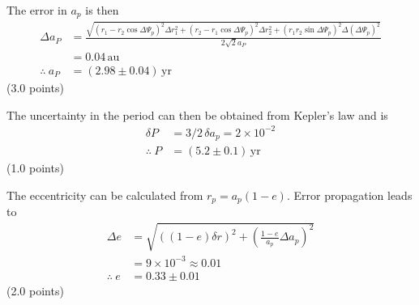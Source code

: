 \begin{description}
  The error in $a_p$ is then
  \begin{align*}
    \Delta a_P &= \frac{\sqrt{(r_1 - r_2\cos\Delta\Psi_p)^2\Delta r_1^2
      + (r_2 - r_1\cos\Delta\Psi_p)^2\Delta r_2^2
      + (r_1 r_2\sin\Delta\Psi_p)^2\Delta(\Delta\Psi_p)^2}}{2\sqrt{2}a_P} \\
      &= 0.04\,\mathrm{au} \\
    \therefore\ a_P &= (2.98\pm0.04)\,\mathrm{yr} %
  \end{align*}
  \hfill(3.0 points)

  The uncertainty in the period can then be obtained from Kepler's law and is
  \begin{align*}
    \delta P &= 3/2\,\delta a_p = 2\times10^{-2} \\
    \therefore\ P &= (5.2\pm0.1)\,\mathrm{yr}
  \end{align*}
  \hfill(1.0 points)

  The eccentricity can be calculated from $r_p = a_p(1 - e)$. Error
  propagation leads to
  \begin{align*}
    \Delta e &= \sqrt{\left((1 - e)\delta r\right)^2
      + \left(\frac{1 - e}{a_p}\Delta a_p\right)^2} \\
      &= 9\times10^{-3} \approx 0.01 \\
    \therefore\ e &= 0.33\pm0.01
  \end{align*}
  \hfill(2.0 points)
\end{description}

